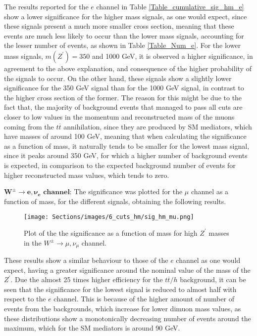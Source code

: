 The results reported for the $e$ channel in Table \ref{Table_cumulative_sig_hm_e} show a lower significance for the higher mass signals, as one would expect, since these signals present a much more smaller cross section, meaning that these events are much less likely to occur than the lower mass signals, accounting for the lesser number of events, as shown in Table \ref{Table_Num_e}. For the lower mass signals, $m(Z^{\prime}) = 350$ and 1000 GeV, it is observed a higher significance, in agreement to the above explanation, and consequence of the higher probability of the signals to occur. On the other hand, these signals show a slightly lower significance for the 350 GeV signal than for the 1000 GeV signal, in contrast to the higher cross section of the former. The reason for this might be due to the fact that, the majority of background events that managed to pass all cuts are closer to low values in the momentum and reconstructed mass of the muons coming from the $t\overline t$ annihilation, since they are produced by SM mediators, which have masses of around 100 GeV, meaning that when calculating the significance as a function of mass, it naturally tends to be smaller for the lowest mass signal, since it peaks around 350 GeV, for which a higher number of background events is expected, in comparison to the expected background number of events for higher reconstructed mass values, which tends to zero.

$\bm{W^{\pm} \rightarrow e, \nu_e} \textbf{ channel:}$ The significance was plotted for the $\mu$ channel as a function of mass, for the different signals, obtaining the following results.

\begin{figure}[ht!]
    \centering
    \texttt{[image: Sections/images/6\_cuts\_hm/sig\_hm\_mu.png]}
    \caption{Plot of the the significance as a function of mass for high $Z^{\prime}$ masses in the $W^{\pm}\rightarrow \mu, \nu_{\mu}$ channel.}
    \label{Sig_mu}
\end{figure}

These results show a similar behaviour to those of the $e$ channel as one would expect, having a greater significance around the nominal value of the mass of the $Z^{\prime}$. Due the almost 25 times higher efficiency for the $t\overline t/h$ background, it can be seen that the significance for the lowest signal is reduced to almost half with respect to the $e$ channel. This is because of the higher amount of number of events from the backgrounds, which increase for lower dimuon mass values, as these distributions show a monotonically decreasing number of events around the maximum, which for the SM mediators is around 90 GeV.

